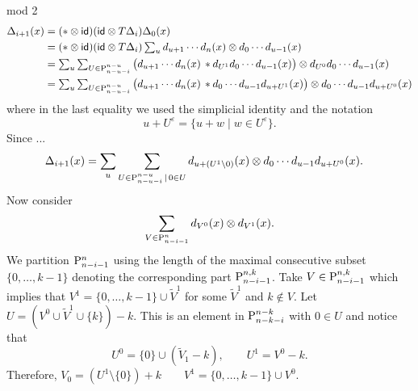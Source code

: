 \documentclass{amsart}
\begin{document}
	\newpage
	mod 2
	\begin{align*}
		\Delta_{i+1}(x) &=
		(\ast \otimes \mathsf{id})(\mathsf{id} \otimes T\Delta_i) \Delta_0(x) \\ &=
		(\ast \otimes \mathsf{id})(\mathsf{id} \otimes T\Delta_i) \textstyle\sum_u d_{u+1} \dotsm d_n(x) \otimes d_{0} \dotsm d_{u-1}(x) \\ &=
		\textstyle\sum_u \sum_{U \in \mathrm{P}^{n-u}_{n-u-i}} \big( d_{u+1} \dotsm d_n(x) \, \ast d_{U^1} d_{0} \dotsm d_{u-1}(x) \big) \otimes d_{U^0} d_{0} \dotsm d_{u-1}(x) \\ &=
		\textstyle\sum_u \sum_{U \in \mathrm{P}^{n-u}_{n-u-i}} \big( d_{u+1} \dotsm d_n(x) \, \ast d_{0} \dotsm d_{u-1} d_{u+U^1}(x) \big) \otimes d_{0} \dotsm d_{u-1} d_{u+U^0}(x)
	\end{align*}
	where in the last equality we used the simplicial identity and the notation
	\[
	u+U^\varepsilon = \{u+w \mid w\in U^\varepsilon\}.
	\]
	Since ...
	\begin{align*}
		\Delta_{i+1}(x) &=
		\sum_u \sum_{U \in \mathrm{P}^{n-u}_{n-u-i} \,|\, 0 \in U} d_{u+(U^1 \setminus 0)}(x) \otimes d_{0} \dotsm d_{u-1} d_{u+U^0}(x).
	\end{align*}
	Now consider
	\[
	\sum_{V \in \mathrm{P}^{n}_{n-i-1}} d_{V^0}(x) \otimes d_{V^1}(x).
	\]
	We partition $\mathrm{P}^{n}_{n-i-1}$ using the length of the maximal consecutive subset $\{0,\dots,k-1\}$ denoting the corresponding part $\mathrm{P}^{n,k}_{n-i-1}$.
	Take $V \in \mathrm{P}^{n,k}_{n-i-1}$ which implies that $V^1 = \{0,\dots,k-1\} \cup \widetilde V^1$ for some $\widetilde V^1$ and $k \notin V$.
	Let $U = (V^0 \cup \widetilde V^1 \cup \{k\})-k$.
	This is an element in $\mathrm{P}^{n-k}_{n-k-i}$ with $0 \in U$ and notice that
	\[
	U^0 = \{0\} \cup (\widetilde V_1-k),
	\qquad
	U^1 = V^0-k.
	\]
	Therefore,
	$V_0 = (U^1 \setminus \{0\})+k
	\qquad
	V^1 = \{0,\dots,k-1\} \cup V^0$.


\end{document}
